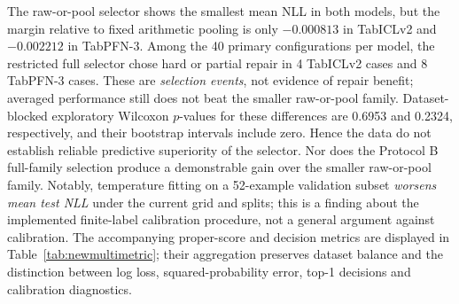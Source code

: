 \documentclass[a4paper,fleqn]{cas-sc}
\begin{document}
The raw-or-pool selector shows the smallest mean NLL in both models, but the margin relative to fixed arithmetic pooling is only $-0.000813$ in TabICLv2 and $-0.002212$ in TabPFN-3. Among the 40 primary configurations per model, the restricted full selector chose hard or partial repair in 4 TabICLv2 cases and 8 TabPFN-3 cases. These are \emph{selection events}, not evidence of repair benefit; averaged performance still does not beat the smaller raw-or-pool family. Dataset-blocked exploratory Wilcoxon $p$-values for these differences are 0.6953 and 0.2324, respectively, and their bootstrap intervals include zero. Hence the data do not establish reliable predictive superiority of the selector. Nor does the Protocol B full-family selection produce a demonstrable gain over the smaller raw-or-pool family. Notably, temperature fitting on a 52-example validation subset \emph{worsens mean test NLL} under the current grid and splits; this is a finding about the implemented finite-label calibration procedure, not a general argument against calibration. The accompanying proper-score and decision metrics are displayed in Table~\ref{tab:newmultimetric}; their aggregation preserves dataset balance and the distinction between log loss, squared-probability error, top-1 decisions and calibration diagnostics.
\end{document}
